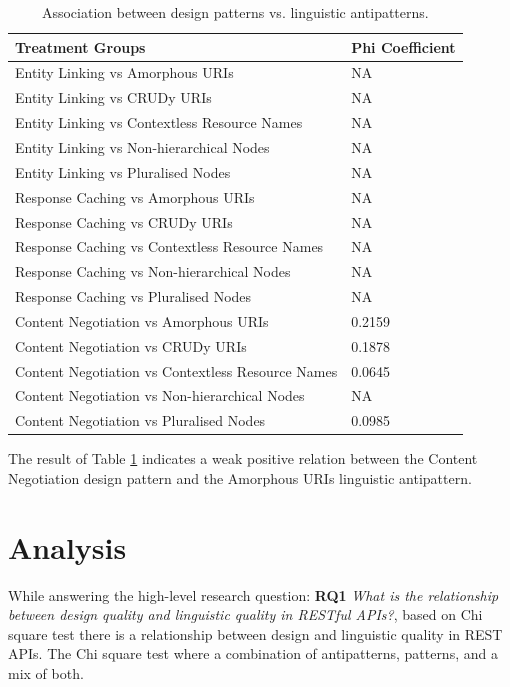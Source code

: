\documentclass[a4paper,12pt]{article}
\begin{document}
\begin{table}[hbt!]
    \centering
    \begin{tabular}{|p{90mm}|p{50mm}|}
\hline \textbf{Treatment Groups} & \textbf{Phi Coefficient} 
\\ \hline 
Entity Linking vs Amorphous URIs & NA
\\ \hline 
Entity Linking vs CRUDy URIs & NA
\\ \hline 
Entity Linking vs Contextless Resource Names & NA
\\ \hline 
Entity Linking vs Non-hierarchical Nodes & NA
\\ \hline 
Entity Linking vs Pluralised Nodes & NA
\\ \hline
Response Caching vs Amorphous URIs & NA
\\ \hline 
Response Caching vs CRUDy URIs & NA
\\ \hline 
Response Caching vs Contextless Resource Names & NA
\\ \hline 
Response Caching vs Non-hierarchical Nodes & NA
\\ \hline 
Response Caching vs Pluralised Nodes & NA
\\ \hline
Content Negotiation vs Amorphous URIs & 0.2159
\\ \hline 
Content Negotiation vs CRUDy URIs & 0.1878
\\ \hline 
Content Negotiation vs Contextless Resource Names & 0.0645
\\ \hline 
Content Negotiation vs Non-hierarchical Nodes & NA
\\ \hline 
Content Negotiation vs Pluralised Nodes & 0.0985
\\ \hline 
    \end{tabular}
    \caption{Association between design patterns vs. linguistic antipatterns.}
    \label{tab:Design patterns vs linguistic antipatterns}
\end{table}

The result of Table \ref{tab:Design patterns vs linguistic antipatterns} indicates a weak positive relation between the  Content Negotiation design pattern and the  Amorphous URIs linguistic antipattern.

\clearpage

\newpage
	
\section{Analysis}

While answering the high-level research question: \textbf{RQ1} \textit{What is the relationship between design quality and linguistic quality in RESTful APIs?}, based on Chi square test there is a relationship between design and linguistic quality in REST APIs. The Chi square test where a combination of antipatterns, patterns, and a mix of both.
\end{document}
